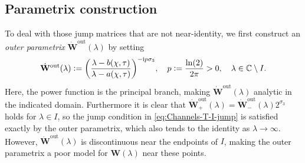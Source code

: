 \subsection{Parametrix construction}
\label{sec:channels-parametrix}
To deal with those jump matrices that are not near-identity, we first construct an \emph{outer parametrix}
$\dot{\mathbf{W}}^{\mathrm{out}}(\lambda)$ by setting
\begin{equation}
\dot{\mathbf{W}}^{\mathrm{out}}(\lambda)\defeq\left(\frac{\lambda-b(\chi,\tau)}{\lambda-a(\chi,\tau)}\right)^{-\ii p\sigma_3},\quad p\defeq\frac{\ln(2)}{2\pi}>0,\quad\lambda\in\mathbb{C}\setminus I.
\label{eq:Channels-Tout}
\end{equation}
Here, the power function is the principal branch, making $\dot{\mathbf{W}}^\mathrm{out}(\lambda)$ analytic in the indicated domain.  Furthermore it is clear that $\dot{\mathbf{W}}_+^\mathrm{out}(\lambda)=\dot{\mathbf{W}}_-^\mathrm{out}(\lambda)2^{\sigma_3}$ holds for $\lambda\in I$, so the jump condition in \eqref{eq:Channels-T-I-jump} is satisfied exactly by the outer parametrix, which also tends to the identity as $\lambda\to\infty$.  However, $\dot{\mathbf{W}}^\mathrm{out}(\lambda)$ is discontinuous near the endpoints of $I$, making the outer parametrix a poor model for $\mathbf{W}(\lambda)$ near these points.  

